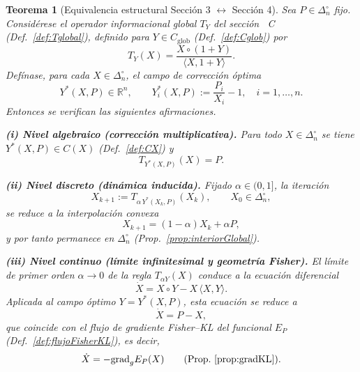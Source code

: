 \documentclass[12pt]{article}
\newtheorem{teorema}{Teorema}[section]
\begin{document}
\begin{teorema}[Equivalencia estructural Sección 3 $\leftrightarrow$ Sección 4]
\label{teo:equivalenciaCD}
Sea $P\in\Delta_n^\circ$ fijo. Considérese el operador informacional global $T_Y$
del sección ~C (Def.~\ref{def:Tglobal}), definido para $Y\in C_{\mathrm{glob}}$
(Def.~\ref{def:Cglob}) por
\[
T_Y(X)=\frac{X\circ(1+Y)}{\langle X,1+Y\rangle}.
\]
Defínase, para cada $X\in\Delta_n^\circ$, el campo de corrección óptima
\[
Y^*(X,P)\in\mathbb{R}^n,
\qquad
Y^*_i(X,P):=\frac{P_i}{X_i}-1,\quad i=1,\dots,n.
\]
Entonces se verifican las siguientes afirmaciones.

\smallskip
\noindent\textbf{(i) Nivel algebraico (corrección multiplicativa).}
Para todo $X\in\Delta_n^\circ$ se tiene $Y^*(X,P)\in C(X)$ (Def.~\ref{def:CX}) y
\[
T_{Y^*(X,P)}(X)=P.
\]

\smallskip
\noindent\textbf{(ii) Nivel discreto (dinámica inducida).}
Fijado $\alpha\in(0,1]$, la iteración
\[
X_{k+1}:=T_{\alpha\,Y^*(X_k,P)}(X_k),\qquad X_0\in\Delta_n^\circ,
\]
se reduce a la interpolación convexa
\[
X_{k+1}=(1-\alpha)X_k+\alpha P,
\]
y por tanto permanece en $\Delta_n^\circ$ (Prop.~\ref{prop:interiorGlobal}).

\smallskip
\noindent\textbf{(iii) Nivel continuo (límite infinitesimal y geometría Fisher).}
El límite de primer orden $\alpha\to 0$ de la regla
$T_{\alpha Y}(X)$ conduce a la ecuación diferencial
\[
\dot X = X\circ Y - X\,\langle X,Y\rangle.
\]
Aplicada al campo óptimo $Y=Y^*(X,P)$, esta ecuación se reduce a
\[
\dot X = P-X,
\]
que coincide con el flujo de gradiente Fisher--KL del funcional $E_P$
(Def.~\ref{def:flujoFisherKL}), es decir,
\[
\dot X=-\mathrm{grad}_g E_P(X)
\qquad
(\text{Prop.~\ref{prop:gradKL}}).
\]

\end{teorema}
\end{document}
